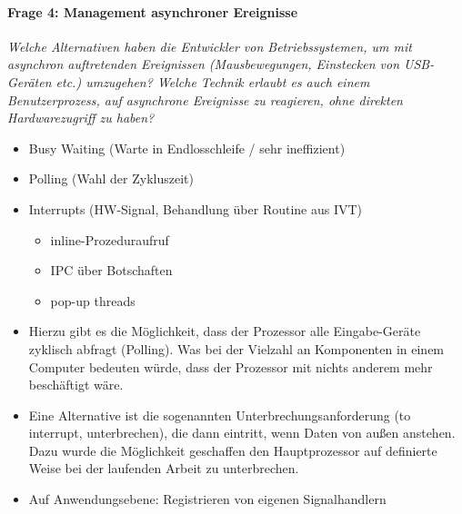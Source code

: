 \documentclass[a4paper]{article}
\begin{document}
\paragraph{Frage 4: Management asynchroner Ereignisse}
\textit{Welche Alternativen haben die Entwickler von Betriebssystemen, um mit asynchron auftretenden Ereignissen (Mausbewegungen, Einstecken von USB-Geräten etc.) umzugehen? Welche Technik erlaubt es auch einem Benutzerprozess, auf asynchrone Ereignisse zu reagieren, ohne direkten Hardwarezugriff zu haben?}
\begin{itemize}
    \item Busy Waiting (Warte in Endlosschleife / sehr ineffizient)
    \item Polling (Wahl der Zykluszeit)
    \item Interrupts (HW-Signal, Behandlung über Routine aus IVT)
          \begin{itemize}
              \item inline-Prozeduraufruf
              \item IPC über Botschaften
              \item pop-up threads
          \end{itemize}
    \item Hierzu gibt es die Möglichkeit, dass der Prozessor alle Eingabe-Geräte zyklisch abfragt (Polling). Was bei der Vielzahl an Komponenten in einem Computer bedeuten würde, dass der Prozessor mit nichts anderem mehr beschäftigt wäre.
    \item Eine Alternative ist die sogenannten Unterbrechungsanforderung (to interrupt, unterbrechen), die dann eintritt, wenn Daten von außen anstehen. Dazu wurde die Möglichkeit geschaffen den Hauptprozessor auf definierte Weise bei der laufenden Arbeit zu unterbrechen.
    \item Auf Anwendungsebene: Registrieren von eigenen Signalhandlern
\end{itemize}

\end{document}
